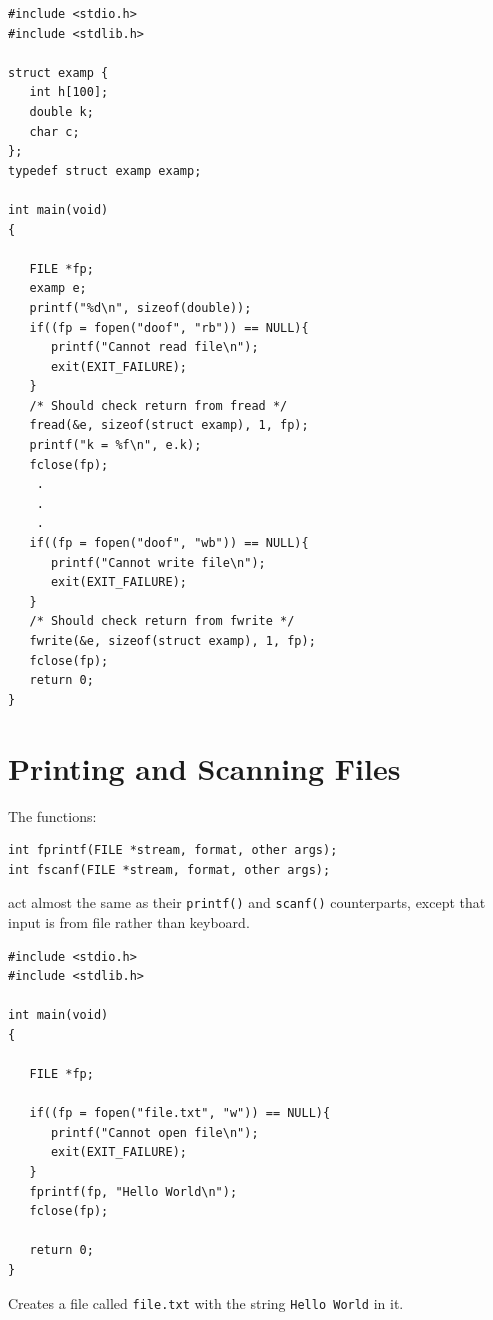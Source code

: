 \documentclass[a4,portraitt]{slides}
\begin{document}
\newpage
{\samepage
\vspace*{-1in}
\begin{small}
\begin{verbatim}
#include <stdio.h>
#include <stdlib.h>

struct examp {
   int h[100];
   double k;
   char c;
};
typedef struct examp examp;

int main(void)
{

   FILE *fp;
   examp e;
   printf("%d\n", sizeof(double));
   if((fp = fopen("doof", "rb")) == NULL){
      printf("Cannot read file\n");
      exit(EXIT_FAILURE);
   }
   /* Should check return from fread */
   fread(&e, sizeof(struct examp), 1, fp);
   printf("k = %f\n", e.k);
   fclose(fp);
    .
    .
    .
   if((fp = fopen("doof", "wb")) == NULL){
      printf("Cannot write file\n");
      exit(EXIT_FAILURE);
   }
   /* Should check return from fwrite */
   fwrite(&e, sizeof(struct examp), 1, fp);
   fclose(fp);
   return 0;
}
\end{verbatim}
\end{small}
}
\newpage
\section*{Printing and Scanning Files}
The functions:
{\small
\begin{verbatim}
int fprintf(FILE *stream, format, other args);
int fscanf(FILE *stream, format, other args);
\end{verbatim}
}
act almost the same as their \verb^printf()^ and \verb^scanf()^
counterparts, except that input is from file rather than keyboard.

\newpage
\begin{small}
\begin{verbatim}
#include <stdio.h>
#include <stdlib.h>

int main(void)
{

   FILE *fp;

   if((fp = fopen("file.txt", "w")) == NULL){
      printf("Cannot open file\n");
      exit(EXIT_FAILURE);
   }
   fprintf(fp, "Hello World\n");
   fclose(fp);

   return 0;
}
\end{verbatim}
\end{small}
Creates a file called \verb^file.txt^ with the
string \verb^Hello World^ in it.

\newpage
\end{document}
